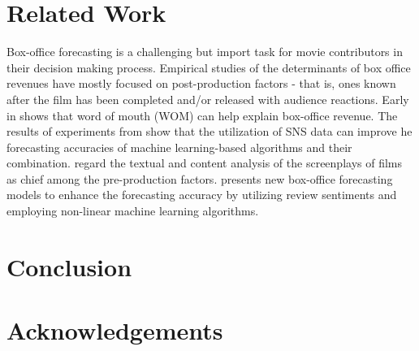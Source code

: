 \section{Related Work}
\label{sec:related}
Box-office forecasting is a challenging but import task for movie contributors in their decision making process. Empirical studies of the determinants of box office revenues have mostly focused on post-production factors - that is, ones known after the film has been completed and/or released with audience reactions. Early in \cite{liu2006word} shows that word of mouth (WOM) can help explain box-office revenue. The results of experiments from \cite{kim2015box} show that the utilization of SNS data can improve he forecasting accuracies of machine learning-based algorithms and their combination. \cite{hunter2016predicting} regard the textual and content analysis of the screenplays of films as chief among the pre-production factors. \cite{hur2016box} presents new box-office forecasting models to enhance the forecasting accuracy by utilizing review sentiments and employing non-linear machine learning algorithms. 

\section{Conclusion}
\label{sec:conclu}

\section{Acknowledgements}